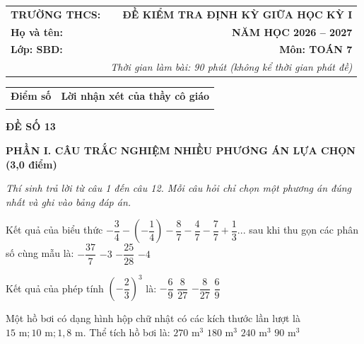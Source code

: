 \documentclass[12pt,a4paper]{article}
\begin{document}
\noindent
\begin{tabularx}{\linewidth}{X r}
\textbf{TRƯỜNG THCS: \dotfill} & \textbf{ĐỀ KIỂM TRA ĐỊNH KỲ GIỮA HỌC KỲ I} \\
\textbf{Họ và tên: \dotfill} & \textbf{NĂM HỌC 2026 -- 2027} \\
\textbf{Lớp: \dotfill \quad SBD: \dotfill} & \textbf{Môn: TOÁN 7} \\
& \textit{Thời gian làm bài: 90 phút (không kể thời gian phát đề)}
\end{tabularx}

\vspace{1mm}
\noindent
\begin{tabularx}{\linewidth}{|p{3.5cm}|X|}
\hline
\centering\textbf{Điểm số} & \centering\textbf{Lời nhận xét của thầy cô giáo} \tabularnewline
\rule{0pt}{0.8cm} & \\
\hline
\end{tabularx}

\vspace{1.5mm}
\begin{center}
\textbf{\large ĐỀ SỐ 13}
\end{center}

\noindent\textbf{\large PHẦN I. CÂU TRẮC NGHIỆM NHIỀU PHƯƠNG ÁN LỰA CHỌN (3,0 điểm)}

\textit{Thí sinh trả lời từ câu 1 đến câu 12. Mỗi câu hỏi chỉ chọn một phương án đúng nhất và ghi vào bảng đáp án.}

\vspace{1mm}
\begin{ex}
Kết quả của biểu thức $-\dfrac{3}{4} - \left(-\dfrac{1}{4}\right) - \dfrac{8}{7} - \dfrac{4}{7} - \dfrac{7}{7} + \dfrac{1}{3}$... sau khi thu gọn các phân số cùng mẫu là:
\choice
{$-\dfrac{37}{7}$}
{\True $-3$}
{$-\dfrac{25}{28}$}
{$-4$}
\end{ex}

\begin{ex}
Kết quả của phép tính $\left(-\dfrac{2}{3}\right)^3$ là:
\choice
{$-\dfrac{6}{9}$}
{$\dfrac{8}{27}$}
{\True $-\dfrac{8}{27}$}
{$\dfrac{6}{9}$}
\end{ex}

\begin{ex}
Một hồ bơi có dạng hình hộp chữ nhật có các kích thước lần lượt là $15\text{ m}; 10\text{ m}; 1{,}8\text{ m}$. Thể tích hồ bơi là:
\choice
{\True $270\text{ m}^3$}
{$180\text{ m}^3$}
{$240\text{ m}^3$}
{$90\text{ m}^3$}
\end{ex}
\end{document}
